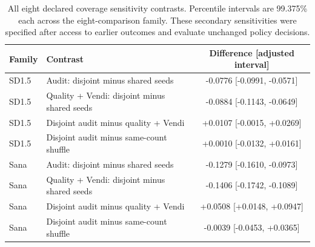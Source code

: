\begin{table}[tp]
\centering\small
\caption{All eight declared coverage sensitivity contrasts. Percentile intervals are 99.375\% each across the eight-comparison family. These secondary sensitivities were specified after access to earlier outcomes and evaluate unchanged policy decisions.}
\begin{tabular}{llc}
\toprule Family & Contrast & Difference [adjusted interval] \\ \midrule
SD1.5 & Audit: disjoint minus shared seeds & -0.0776 [-0.0991, -0.0571]\\
SD1.5 & Quality + Vendi: disjoint minus shared seeds & -0.0884 [-0.1143, -0.0649]\\
SD1.5 & Disjoint audit minus quality + Vendi & +0.0107 [-0.0015, +0.0269]\\
SD1.5 & Disjoint audit minus same-count shuffle & +0.0010 [-0.0132, +0.0161]\\
Sana & Audit: disjoint minus shared seeds & -0.1279 [-0.1610, -0.0973]\\
Sana & Quality + Vendi: disjoint minus shared seeds & -0.1406 [-0.1742, -0.1089]\\
Sana & Disjoint audit minus quality + Vendi & +0.0508 [+0.0148, +0.0947]\\
Sana & Disjoint audit minus same-count shuffle & -0.0039 [-0.0453, +0.0365]\\
\bottomrule\end{tabular}
\end{table}
